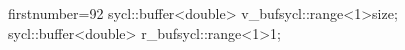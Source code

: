 \begin{cppcode*}{firstnumber=92}
        sycl::buffer<double> v_buf{sycl::range<1>{size}};
        sycl::buffer<double> r_buf{sycl::range<1>{1}};
\end{cppcode*}
